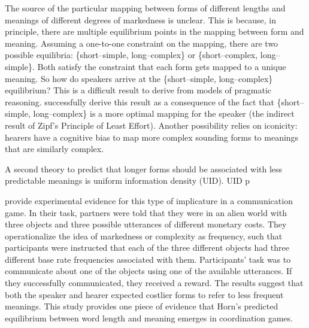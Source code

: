 \documentclass[man]{apa2}
\begin{document}
The source of the particular mapping between forms of different lengths and meanings of different degrees of markedness is unclear. This is because, in principle, there are multiple equilibrium points in the mapping between form and meaning. Assuming a one-to-one constraint on the mapping, there are two possible equilibria: \{short--simple, long--complex\} or \{short--complex, long--simple\}. Both satisfy the constraint that each  form gets mapped to a unique meaning. So how do speakers arrive at the  \{short--simple, long--complex\} equilibrium? This is a difficult result to derive from models of pragmatic reasoning.  successfully derive this result as a consequence of the fact that \{short--simple, long--complex\} is a more optimal mapping for the speaker (the indirect result of Zipf's Principle of Least Effort). Another possibility relies on iconicity: hearers have a cognitive bias to map more complex sounding forms to meanings that are similarly complex. 

A second theory to predict that longer forms should be associated with less predictable meanings is uniform information density (UID). UID p

  provide experimental evidence for this type of implicature in a communication game.  In their task, partners were told that they were in an alien world with three objects and three possible utterances of different monetary costs. They operationalize the idea of markedness or complexity as frequency, such that participants were instructed that each of the three different objects had three different base rate frequencies  associated with them.  Participants' task was to communicate about one of the objects using one of the available utterances. If they successfully communicated, they received a reward. The results suggest that both the speaker and hearer expected costlier forms to refer to less frequent meanings. This study provides one piece of evidence that Horn's predicted equilibrium between word length and meaning emerges in coordination games.  
\end{document}
